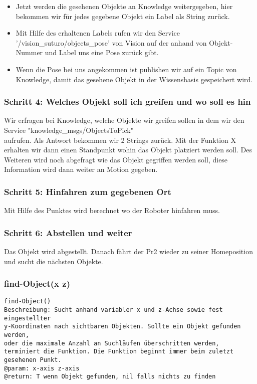 \documentclass{suturo}
\begin{document}
\begin{itemize} 
\item Jetzt werden die gesehenen Objekte an Knowledge weitergegeben, hier bekommen wir für jedes gegebene Objekt ein Label als String zurück.
\item Mit Hilfe des erhaltenen Labels rufen wir den Service '/vision\_suturo/objects\_pose' von Vision auf der anhand von Objekt-Nummer und Label uns eine Pose zurück gibt.  
\item Wenn die Pose bei uns angekommen ist publishen wir auf ein Topic von Knowledge, damit das gesehene Objekt in der Wissensbasis gespeichert wird.
\end{itemize}





\subsubsection{Schritt 4: Welches Objekt soll ich greifen und wo soll es hin}
Wir erfragen bei Knowledge, welche Objekte wir greifen sollen in dem wir den Service "knowledge\_msgs/ObjectsToPick" \\
aufrufen. Als Antwort bekommen wir 2 Strings zurück.
Mit der Funktion X erhalten wir dann einen Standpunkt wohin das Objekt platziert werden soll. %
Des Weiteren wird noch abgefragt wie das Objekt gegriffen werden soll, diese Information wird dann weiter an Motion gegeben.

\subsubsection{Schritt 5: Hinfahren zum gegebenen Ort}
Mit Hilfe des Punktes wird berechnet wo der Roboter hinfahren muss. 
 
\subsubsection{Schritt 6: Abstellen und weiter}
Das Objekt wird abgestellt.
Danach fährt der Pr2 wieder zu seiner Homeposition und sucht die nächsten Objekte.






\subsubsection{find-Object(x z)}
\begin{verbatim}
find-Object()
Beschreibung: Sucht anhand variabler x und z-Achse sowie fest eingestellter
y-Koordinaten nach sichtbaren Objekten. Sollte ein Objekt gefunden werden,
oder die maximale Anzahl an Suchläufen überschritten werden,
terminiert die Funktion. Die Funktion beginnt immer beim zuletzt gesehenen Punkt.
@param: x-axis z-axis
@return: T wenn Objekt gefunden, nil falls nichts zu finden
\end{verbatim}
\end{document}
